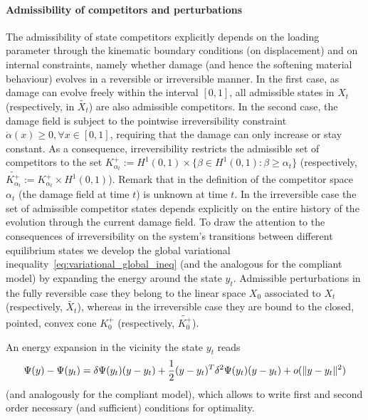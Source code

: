 \paragraph{Admissibility of competitors and perturbations}
The admissibility of state competitors explicitly depends on the loading parameter through the kinematic boundary conditions (on displacement) and on internal constraints, namely whether damage (and hence the softening material behaviour)  evolves in a reversible or irreversible manner.
In the first case, as damage can evolve freely within the interval $[0, 1]$, all admissible states in $X_t$  (respectively, in $\widetilde{X_t}$) are also admissible competitors. 
In the second case, the damage field is subject to the pointwise irreversibility constraint $\dot \alpha(x)\geq 0, \forall x\in [0, 1]$, requiring that the damage can only increase or stay constant. 
As a consequence, irreversibility restricts the admissible set of competitors to the set $K^+_{\alpha_t}:=H^1(0, 1) \times \{\beta\in H^1(0, 1): \beta\geq \alpha_t\}$ (respectively, $\widetilde{K^+_{\alpha_t}}:=K^+_{\alpha_t}\times H^1(0, 1)$). 
Remark that in the definition of the competitor space $\alpha_t$ (the damage field at time $t$) is unknown at time $t$. 
In the irreversible case the set of admissible competitor states depends explicitly on the entire history of the evolution through the current damage field.
To draw the attention to the consequences of irreversibility on the system's transitions between different equilibrium states we develop the global variational inequality~\eqref{eq:variational_global_ineq} (and the analogous for the compliant model) by expanding the energy around the state $y_t$. 
Admissible perturbations in the fully reversible case they belong to the linear space $X_0$ associated to $X_t$ (respectively, $\widetilde{X_t}$), whereas in the irreversible case they are bound to the closed, pointed, convex cone $K^+_0$ (respectively, $\widetilde{K^+_0}$).

An energy expansion in the vicinity the state $y_t$ reads
$$
\Psi(y)-\Psi(y_t)= \delta\Psi(y_t)(y-y_t)+\frac{1}{2}(y-y_t)^T \delta^2\Psi(y_t)(y-y_t)+o(\|y-y_t\|^2)
    \label{eqn:energy-expansion}
$$
(and analogously for the compliant model), which allows to write first and second order necessary (and sufficient) conditions for optimality.


